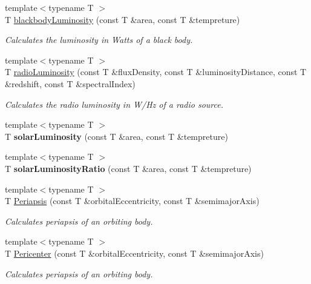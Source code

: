 \begin{DoxyCompactItemize}
{\footnotesize template$<$typename T $>$ }\\T \mbox{\hyperlink{group___e_g_x_phys-_luminosity_ga909f82edfaed449b44e94788b642ebb8}{blackbody\+Luminosity}} (const T \&area, const T \&tempreture)
\begin{DoxyCompactList}\small\item\em Calculates the luminosity in Watts of a black body. \end{DoxyCompactList}\item 
{\footnotesize template$<$typename T $>$ }\\T \mbox{\hyperlink{group___e_g_x_phys-_luminosity_ga6d6865b2aac1bc7c7f06b7c4ac2444e4}{radio\+Luminosity}} (const T \&flux\+Density, const T \&luminosity\+Distance, const T \&redshift, const T \&spectral\+Index)
\begin{DoxyCompactList}\small\item\em Calculates the radio luminosity in W/\+Hz of a radio source. \end{DoxyCompactList}\item 
\mbox{\label{namespace_e_g_x_phys_ade3d05c9dcd810cb5290375d11587b6a}} 
{\footnotesize template$<$typename T $>$ }\\T {\bfseries solar\+Luminosity} (const T \&area, const T \&tempreture)
\item 
\mbox{\label{namespace_e_g_x_phys_ac5e66686d7910587e3636b7984d466e9}} 
{\footnotesize template$<$typename T $>$ }\\T {\bfseries solar\+Luminosity\+Ratio} (const T \&area, const T \&tempreture)
\item 
{\footnotesize template$<$typename T $>$ }\\T \mbox{\hyperlink{group___e_g_x_phys-_periapsis_ga4414ac75539371ec874a3d25cad6c9fe}{Periapsis}} (const T \&orbital\+Eccentricity, const T \&semimajor\+Axis)
\begin{DoxyCompactList}\small\item\em Calculates periapsis of an orbiting body. \end{DoxyCompactList}\item 
{\footnotesize template$<$typename T $>$ }\\T \mbox{\hyperlink{group___e_g_x_phys-_periapsis_gac4c419a87a5802cf6afc98f50792e99f}{Pericenter}} (const T \&orbital\+Eccentricity, const T \&semimajor\+Axis)
\begin{DoxyCompactList}\small\item\em Calculates periapsis of an orbiting body. \end{DoxyCompactList}\item 

\end{DoxyCompactItemize}
